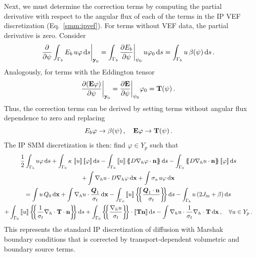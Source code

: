 \documentclass[../doc.tex]{subfiles}
\begin{document}
Next, we must determine the correction terms by computing the partial derivative with respect to the angular flux of each of the terms in the IP VEF discretization (Eq.~\ref{smm:ipvef}). For terms without VEF data, the partial derivative is zero. Consider 
	\begin{equation}
		\frac{\partial }{\partial \psi}\int_{\Gamma_b} E_b\, u \varphi \mathop{}\!\mathrm{d} s \biggr\rvert_{\boldsymbol{\mathrm{y}}_0} = \int_{\Gamma_b} \frac{\partial E_b}{\partial \psi}\biggr\rvert_{\psi_0} \, u \varphi_0 \mathop{}\!\mathrm{d} s = \int_{\Gamma_b} u\, \beta(\psi) \mathop{}\!\mathrm{d} s \,. 
	\end{equation}
Analogously, for terms with the Eddington tensor
	\begin{equation}
		\frac{\partial (\boldsymbol{\mathrm{E}}\varphi)}{\partial \psi}\biggr\rvert_{\boldsymbol{\mathrm{y}}_0} = \frac{\partial \boldsymbol{\mathrm{E}}}{\partial \psi}\biggr\rvert_{\psi_0} \varphi_0 = \boldsymbol{\mathrm{T}}(\psi) \,. 
	\end{equation}
Thus, the correction terms can be derived by setting terms without angular flux dependence to zero and replacing 
	\begin{equation}
		E_b\varphi \rightarrow \beta(\psi) \,, \quad \boldsymbol{\mathrm{E}}\varphi \rightarrow \boldsymbol{\mathrm{T}}(\psi) \,. 
	\end{equation}
The IP SMM discretization is then: find $\varphi \in Y_p$ such that 
	\begin{multline}
		\frac{1}{2}\int_{\Gamma_b} u\varphi \ud s + \int_{\Gamma_0} \kappa\, \jump{u}\jump{\varphi} \ud s - \int_{\Gamma_0} \jump{u}\avg{D\nablah\varphi\cdot\n} \ud s - \int_{\Gamma_0} \avg{D\nablah u\cdot\n} \jump{\varphi} \ud s \\
		+ \int \nablah u \cdot D\nablah\varphi \ud \x + \int \sigma_a\, u \varphi \ud \x \\
		= \int u\, Q_0 \ud \x + \int \nablah u \cdot \frac{\vec{Q}_1}{\sigma_t} \ud \x - \int_{\Gamma_0} \jump{u} \avg{\frac{\vec{Q}_1\cdot\n}{\sigma_t}} \ud s - \int_{\Gamma_b} u\paren{2\Jin + \beta} \ud s \\
		+ \int_{\Gamma_0} \jump{u}\avg{\frac{1}{\sigma_t}\nablah\cdot\T\cdot\n} \ud s + \int_{\Gamma_0} \avg{\frac{\nablah u}{\sigma_t}} \cdot\jump{\T\n} \ud s - \int \nablah u\cdot \frac{1}{\sigma_t}\nablah\cdot\T \ud \x \,, \quad \forall u \in Y_p \,. 
	\end{multline}
This represents the standard IP discretization of diffusion with Marshak boundary conditions that is corrected by transport-dependent volumetric and boundary source terms. 
\end{document}
